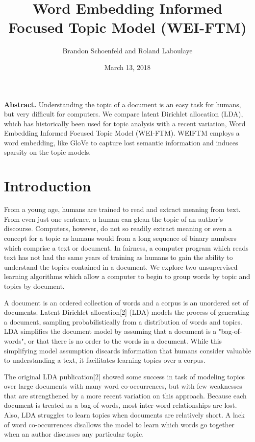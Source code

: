 \documentclass[letterpaper, 11pt]{article}
\begin{document}
\title{Word Embedding Informed Focused Topic Model (WEI-FTM)}
\author{Brandon Schoenfeld and Roland Laboulaye}
\date{March 13, 2018}
\maketitle

\begin{multicols}{2}

\noindent \textbf{Abstract.} Understanding the topic of a document is an easy task for humans, but
very difficult for computers.
We compare latent Dirichlet allocation (LDA), which has historically been used for topic analysis
with a recent variation, Word Embedding Informed Focused Topic Model (WEI-FTM).
WEIFTM employs a word embedding, like GloVe to capture lost semantic information and induces
sparsity on the topic models.

\section{Introduction}
From a young age, humans are trained to read and extract meaning from text.
From even just one sentence, a human can glean the topic of an author's discourse.
Computers, however, do not so readily extract meaning or even a concept for a topic as humans would
from a long sequence of binary numbers which comprise a text or document.
In fairness, a computer program which reads text has not had the same years of training as humans to
gain the ability to understand the topics contained in a document.
We explore two unsupervised learning algorithms which allow a computer to begin to group words by
topic and topics by document.

A document is an ordered collection of words and a corpus is an unordered set of documents.
Latent Dirichlet allocation[2] (LDA) models the process of generating a document, sampling
probabilistically from a distribution of words and topics.
LDA simplifies the document model by assuming that a document is a "bag-of-words", or that there is
no order to the words in a document.
While this simplifying model assumption discards information that humans consider valuable to
understanding a text, it facilitates learning topics over a corpus.

The original LDA publication[2] showed some success in task of modeling topics over
large documents with many word co-occurrences, but with few weaknesses that are strengthened by a
more recent variation on this approach.
Because each document is treated as a bag-of-words, most inter-word relationships are lost.
Also, LDA struggles to learn topics when documents are relatively short.
A lack of word co-occurrences disallows the model to learn which words go together when an author
discusses any particular topic.


\end{multicols}
\end{document}
